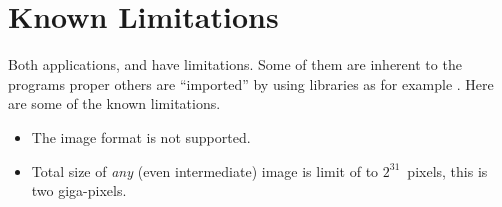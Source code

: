 

\chapter[Known Limitations\commonpart]{Known Limitations\commonpart
  \label{sec:known-limitations}
  }

Both applications,  and  have
limitations.  Some of them are inherent to the programs proper others
are ``imported'' by using libraries as for example
.  Here are some of the known
limitations.

\begin{itemize}
  \item The  image
    format is not supported.

  \item Total size of \emph{any} (even intermediate) image is limit of
    to $2^{31}$~pixels, this is two giga-pixels.
\end{itemize}

